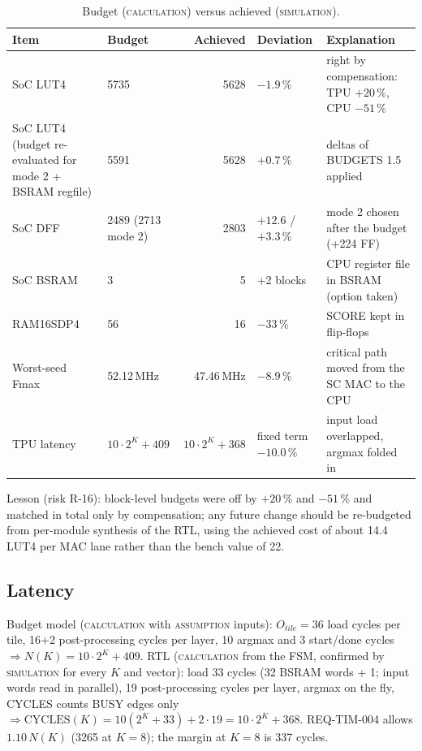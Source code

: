 \documentclass[10pt,a4paper]{article}
\newcommand{\lbl}[1]{\textsc{#1}}          %
\begin{document}
\begin{table}[htbp]
\centering\small
\caption{Budget (\lbl{calculation}) versus achieved (\lbl{simulation}).}\label{tab:budget}
\begin{tabularx}{\linewidth}{@{}P{3.6cm}P{2.2cm}rP{1.9cm}L@{}}
\toprule
Item & Budget & Achieved & Deviation & Explanation\\
\midrule
SoC LUT4 & 5735 & 5628 & $-1.9$\,\% & right by compensation: TPU $+20$\,\%, CPU $-51$\,\%\\
SoC LUT4 (budget re-evaluated for mode 2 + BSRAM regfile) & 5591 & 5628 & $+0.7$\,\% & deltas of BUDGETS 1.5 applied\\
SoC DFF & 2489 (2713 mode 2) & 2803 & $+12.6$ / $+3.3$\,\% & mode 2 chosen after the budget (+224 FF)\\
SoC BSRAM & 3 & 5 & +2 blocks & CPU register file in BSRAM (option taken)\\
RAM16SDP4 & 56 & 16 & $-33$\,\% & SCORE kept in flip-flops\\
Worst-seed Fmax & 52.12\,MHz & 47.46\,MHz & $-8.9$\,\% & critical path moved from the SC MAC to the CPU\\
TPU latency & $10\cdot2^K+409$ & $10\cdot2^K+368$ & fixed term $-10.0$\,\% & input load overlapped, argmax folded in\\
\bottomrule
\end{tabularx}
\end{table}
Lesson (risk R-16): block-level budgets were off by $+20$\,\% and $-51$\,\%
and matched in total only by compensation; any future change should be
re-budgeted from per-module synthesis of the RTL, using the achieved cost of
about 14.4 LUT4 per MAC lane rather than the bench value of 22.

\subsection{Latency}
Budget model (\lbl{calculation} with \lbl{assumption} inputs): $O_{tile}=36$
load cycles per tile, 16+2 post-processing cycles per layer, 10 argmax and 3
start/done cycles $\Rightarrow N(K)=10\cdot2^K+409$. RTL (\lbl{calculation}
from the FSM, confirmed by \lbl{simulation} for every $K$ and vector): load
33 cycles (32 BSRAM words + 1; input words read in parallel), 19
post-processing cycles per layer, argmax on the fly, CYCLES counts BUSY edges
only $\Rightarrow \mathrm{CYCLES}(K)=10(2^K+33)+2\cdot19=10\cdot2^K+368$.
REQ-TIM-004 allows $1.10\,N(K)$ (3265 at $K=8$); the margin at $K=8$ is 337
cycles.
\end{document}
